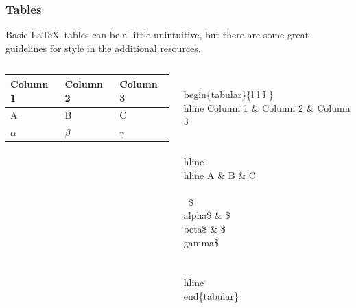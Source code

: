 \documentclass{beamer}
\begin{document}
\begin{frame}[fragile]
	\frametitle{Tables}
	Basic \LaTeX\ tables can be a little unintuitive, but there are some great guidelines for style in the additional resources.\bigskip
	\begin{columns}[c]
		\begin{column}{0.45\textwidth}
		\begin{tabular}{| l l l |}
			\hline
			Column 1 & Column 2 & Column 3 \\
			\hline \hline
			A & B & C \\
			$\alpha$ & $\beta$ & $\gamma$ \\
			\hline
		\end{tabular}
		\end{column}
		\hspace{30pt}
		\vrule
		\hspace{10pt}
		\begin{column}{0.45\textwidth}
		\begin{semiverbatim}
			\begin{tiny}
				\\begin\{tabular\}\{\textbar l l l \textbar\}
					\\hline
					Column 1 \& Column 2 \& Column 3 \\\\
					\\hline \\hline
					A \& B \& C \\ \\\
					\$\\alpha\$ \& \$\\beta\$ \& \$\\gamma\$ \\\\
					\\hline
				\\end\{tabular\}
			\end{tiny}
		\end{semiverbatim}
		\end{column}
	\end{columns}
\end{frame}
\end{document}
